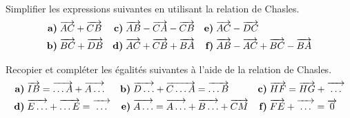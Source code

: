 \documentclass[11pt]{article}
\begin{document}
\begin{exo}
  Simplifier les expressions suivantes en utilisant la relation de Chasles.
  \begin{align*}
    \textbf{a)}\;& \overrightarrow{AC}+\overrightarrow{CB} &
    \textbf{c)}\;& \overrightarrow{AB}-\overrightarrow{CA}-\overrightarrow{CB} &
    \textbf{e)}\;& \overrightarrow{AC}-\overrightarrow{DC} \\
    \textbf{b)}\;& \overrightarrow{BC}+\overrightarrow{DB} &
    \textbf{d)}\;& \overrightarrow{AC}+\overrightarrow{CB}+\overrightarrow{BA} &
    \textbf{f)}\;& \overrightarrow{AB}-\overrightarrow{AC}+\overrightarrow{BC}-\overrightarrow{BA}
  \end{align*}
\end{exo}

\begin{exo}
  Recopier et compléter les égalités suivantes à l'aide de la relation de
  Chasles.
  \begin{align*}
    \textbf{a)}\;& \vect{IB} = \vect{\ldots A}+\vect{A\ldots} &
    \textbf{b)}\;& \vect{D\ldots} + \vect{C\ldots A}=\vect{\ldots B} &
    \textbf{c)}\;& \vect{HF} = \vect{HG} + \vect{\phantom{i}\!\ldots\!\phantom{i}} \\
    \textbf{d)}\;& \vect{E\ldots} + \vect{\ldots E} =
    \vect{\phantom i\!\ldots\!\phantom i} &
    \textbf{e)}\;& \vect{A\ldots} = \vect{A\ldots}+\vect{B \ldots} +
    \vect{CM} &
    \textbf{f)}\;& \vect{FE} + \vect{\phantom{i}\!\ldots\!\phantom{i}} = \vect0 \\
  \end{align*}
\end{exo}
\end{document}
